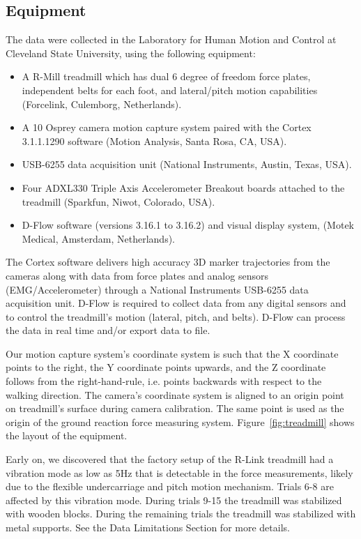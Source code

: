 \documentclass[fleqn,12pt]{wlpeerj}
\begin{document}
\subsection*{Equipment}
%
The data were collected in the Laboratory for Human Motion and Control at
Cleveland State University, using the following equipment:
%
\begin{itemize}
  \item A R-Mill treadmill which has dual 6 degree of freedom force plates,
    independent belts for each foot, and lateral/pitch motion capabilities
    (Forcelink, Culemborg, Netherlands).
  \item A 10 Osprey camera motion capture system paired with the Cortex
    3.1.1.1290 software (Motion Analysis, Santa Rosa, CA, USA).
  \item USB-6255 data acquisition unit (National Instruments, Austin, Texas,
    USA).
  \item Four ADXL330 Triple Axis Accelerometer Breakout boards attached to the
    treadmill (Sparkfun, Niwot, Colorado, USA).
  \item D-Flow software (versions 3.16.1 to 3.16.2) and visual display system,
    (Motek Medical, Amsterdam, Netherlands).
\end{itemize}

The Cortex software delivers high accuracy 3D marker trajectories from the
cameras along with data from force plates and analog sensors
(EMG/Accelerometer) through a National Instruments USB-6255 data acquisition
unit. D-Flow is required to collect data from any digital sensors and to
control the treadmill's motion (lateral, pitch, and belts). D-Flow can process
the data in real time and/or export data to file.

Our motion capture system's coordinate system is such that the X coordinate
points to the right, the Y coordinate points upwards, and the Z coordinate
follows from the right-hand-rule, i.e. points backwards with respect to the
walking direction. The camera's coordinate system is aligned to an origin point
on treadmill's surface during camera calibration. The same point is used as the
origin of the ground reaction force measuring system.
Figure~\ref{fig:treadmill} shows the layout of the equipment.

Early on, we discovered that the factory setup of the R-Link treadmill had a
vibration mode as low as 5\si{\hertz} that is detectable in the force measurements,
likely due to the flexible undercarriage and pitch motion mechanism. Trials 6-8
are affected by this vibration mode. During trials 9-15 the treadmill was
stabilized with wooden blocks. During the remaining trials the treadmill was
stabilized with metal supports. See the Data Limitations Section for more
details.
\end{document}

